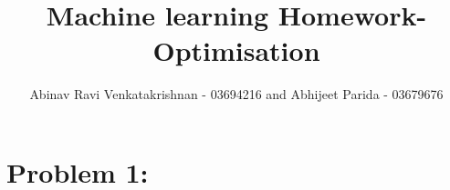 \documentclass[5pt,a4paper]{article}
\begin{document}
	\title{Machine learning Homework- Optimisation}
	\author{Abinav Ravi Venkatakrishnan - 03694216 and Abhijeet Parida - 03679676}
	\maketitle
	\section*{Problem 1:}
\end{document}
